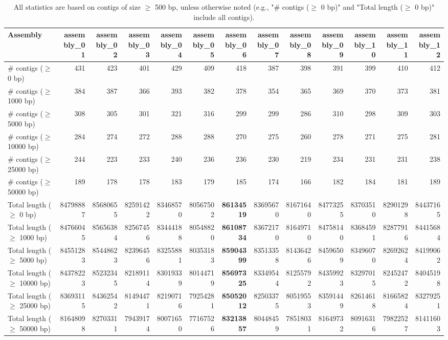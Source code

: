 \documentclass[12pt,a4paper]{article}
\begin{document}
\begin{table}[ht]
\begin{center}
\caption{All statistics are based on contigs of size $\geq$ 500 bp, unless otherwise noted (e.g., "\# contigs ($\geq$ 0 bp)" and "Total length ($\geq$ 0 bp)" include all contigs).}
\begin{tabular}{|l*{12}{|r}|}
\hline
Assembly & assembly\_01 & assembly\_02 & assembly\_03 & assembly\_04 & assembly\_05 & assembly\_06 & assembly\_07 & assembly\_08 & assembly\_09 & assembly\_10 & assembly\_11 & assembly\_12 \\ \hline
\# contigs ($\geq$ 0 bp) & 431 & 423 & 401 & 429 & 409 & 418 & 387 & 398 & 391 & 399 & 410 & 412 \\ \hline
\# contigs ($\geq$ 1000 bp) & 384 & 387 & 366 & 393 & 382 & 378 & 354 & 365 & 369 & 370 & 373 & 381 \\ \hline
\# contigs ($\geq$ 5000 bp) & 308 & 305 & 301 & 321 & 316 & 299 & 299 & 286 & 310 & 298 & 309 & 303 \\ \hline
\# contigs ($\geq$ 10000 bp) & 284 & 274 & 272 & 288 & 288 & 270 & 275 & 260 & 278 & 271 & 275 & 281 \\ \hline
\# contigs ($\geq$ 25000 bp) & 244 & 223 & 233 & 240 & 236 & 236 & 230 & 219 & 234 & 231 & 231 & 238 \\ \hline
\# contigs ($\geq$ 50000 bp) & 189 & 178 & 178 & 183 & 179 & 185 & 174 & 166 & 182 & 184 & 181 & 189 \\ \hline
Total length ($\geq$ 0 bp) & 84798887 & 85680655 & 82591422 & 83468570 & 80567502 & {\bf 86134519} & 83695670 & 81671640 & 84773255 & 83703510 & 82901298 & 84437165 \\ \hline
Total length ($\geq$ 1000 bp) & 84766045 & 85656384 & 82567456 & 83444188 & 80548820 & {\bf 86108734} & 83672170 & 81649710 & 84758140 & 83684591 & 82877916 & 84415684 \\ \hline
Total length ($\geq$ 5000 bp) & 84551283 & 85448623 & 82396456 & 83255881 & 80353183 & {\bf 85904399} & 83513358 & 81436426 & 84596509 & 83496070 & 82692624 & 84199062 \\ \hline
Total length ($\geq$ 10000 bp) & 84378223 & 85232345 & 82189114 & 83019339 & 80144719 & {\bf 85697325} & 83349544 & 81255792 & 84359923 & 83297015 & 82452472 & 84045198 \\ \hline
Total length ($\geq$ 25000 bp) & 83693115 & 84362542 & 81494471 & 82190716 & 79254281 & {\bf 85052012} & 82503375 & 80519553 & 83591449 & 82614618 & 81665824 & 83279251 \\ \hline
Total length ($\geq$ 50000 bp) & 81648098 & 82703311 & 79439174 & 80071650 & 77167526 & {\bf 83213857} & 80448459 & 78518031 & 81649732 & 80916316 & 79822527 & 81411603 \\ \hline

\end{tabular}
\end{center}
\end{table}
\end{document}
